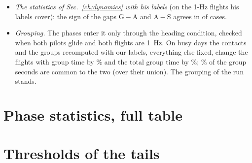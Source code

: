 \documentclass[10pt,a4paper]{article}
\newcommand{\G}{\mathrm{G}}
\newcommand{\A}{\mathrm{A}}
\newcommand{\Sl}{\mathrm{S}}
\newenvironment{step}{\begin{description}[leftmargin=0pt, itemsep=7pt, topsep=8pt]}{\end{description}}
\begin{document}
\begin{step}
\begin{itemize}
    count every run labelled search; the statistics of the text count fewer, since the context rule of
    Sec.~\ref{phases} moves the re-centrings into the climbs and the exits apart.
  \item \emph{The statistics of Sec.~\ref{ch:dynamics} with his labels} (on the 1-Hz flights his labels cover): the
    sign of the gaps $\G-\A$ and $\A-\Sl$ agrees in \PhSignAgree{} of \PhSignTotal{} cases.
  \item \emph{Grouping.} The phases enter it only through the heading condition, checked when both pilots glide
    and both flights are 1~Hz. On \GroupCheckDays{} busy days the contacts and the groups recomputed with our labels,
    everything else fixed, change the flights with group time by \GroupCheckFlightsChange\% and the total group time
    by \GroupCheckTimeChange\%; \GroupCheckShared\% of the group seconds are common to the two (over their union).
    The grouping of the run stands.
  \end{itemize}
\end{step}

\section{Phase statistics, full table}\label{app:phases-table}

\begin{table}[H]
\centering
{}
\caption{Every phase statistic: $\G-\A$ and $\A-\Sl$ per ground class, 90\% bands. Our labels.}
\end{table}

\section{Thresholds of the tails}\label{app:tails}
\end{document}
